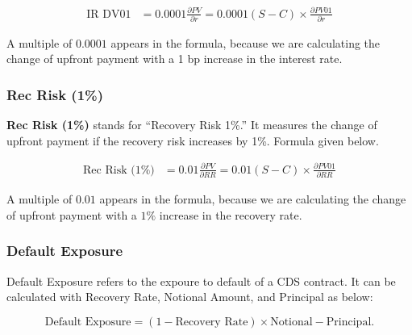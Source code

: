 \documentclass{jss}
\begin{document}
\begin{align*}
  \text{IR DV01} &= 0.0001 \frac{\partial PV}{\partial r} = 0.0001 (S - C) \times \frac{\partial PV01}{\partial r}
\end{align*}

A multiple of $0.0001$ appears in the formula, because we are calculating the change of upfront payment with a 1 bp increase in the interest rate.

\subsubsection{Rec Risk (1\%)}
\textbf{Rec Risk (1\%)} stands for ``Recovery Risk 1\%.'' It measures the change of upfront payment if the recovery risk increases by 1\%. Formula given below.

\begin{align*}
  \text{Rec Risk (1\%)} &= 0.01 \frac{\partial PV}{\partial RR} = 0.01 (S - C) \times \frac{\partial PV01}{\partial RR}
\end{align*}

A multiple of $0.01$ appears in the formula, because we are calculating the change of upfront payment with a $1\%$ increase in the recovery rate.

\subsubsection{Default Exposure}
\label{sec:DefaultExpo}

Default Exposure refers to the expoure to default of a CDS contract. It can be calculated with Recovery Rate, Notional Amount, and Principal as below:

\begin{equation}
  \text{Default Exposure} = (1 - \text{Recovery Rate}) \times \text{Notional}
  - \text{Principal}. \nonumber
\end{equation} 
\end{document}
